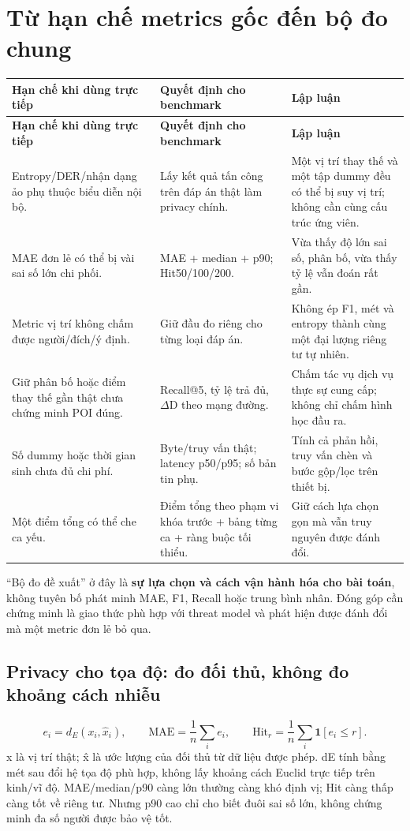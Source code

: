 \documentclass[10pt,a4paper]{article}
\begin{document}
\clearpage
\section{Từ hạn chế metrics gốc đến bộ đo chung}
\begingroup\small
\begin{longtable}{@{}P{5.218cm}P{5.021cm}P{6.399cm}@{}}
\toprule
\textbf{Hạn chế khi dùng trực tiếp} & \textbf{Quyết định cho benchmark} & \textbf{Lập luận}\\\midrule
\endfirsthead
\toprule
\textbf{Hạn chế khi dùng trực tiếp} & \textbf{Quyết định cho benchmark} & \textbf{Lập luận}\\\midrule
\endhead
\bottomrule\endfoot
Entropy/DER/nhận dạng ảo phụ thuộc biểu diễn nội bộ. & Lấy kết quả tấn công trên đáp án thật làm privacy chính. & Một vị trí thay thế và một tập dummy đều có thể bị suy vị trí; không cần cùng cấu trúc ứng viên.\\
\addlinespace[3pt]
MAE đơn lẻ có thể bị vài sai số lớn chi phối. & MAE + median + p90; Hit50/100/200. & Vừa thấy độ lớn sai số, phân bố, vừa thấy tỷ lệ vẫn đoán rất gần.\\
\addlinespace[3pt]
Metric vị trí không chấm được người/đích/ý định. & Giữ đầu đo riêng cho từng loại đáp án. & Không ép F1, mét và entropy thành cùng một đại lượng riêng tư tự nhiên.\\
\addlinespace[3pt]
Giữ phân bố hoặc điểm thay thế gần thật chưa chứng minh POI đúng. & Recall@5, tỷ lệ trả đủ, $\Delta$D theo mạng đường. & Chấm tác vụ dịch vụ thực sự cung cấp; không chỉ chấm hình học đầu ra.\\
\addlinespace[3pt]
Số dummy hoặc thời gian sinh chưa đủ chi phí. & Byte/truy vấn thật; latency p50/p95; số bản tin phụ. & Tính cả phản hồi, truy vấn chèn và bước gộp/lọc trên thiết bị.\\
\addlinespace[3pt]
Một điểm tổng có thể che ca yếu. & Điểm tổng theo phạm vi khóa trước + bảng từng ca + ràng buộc tối thiểu. & Giữ cách lựa chọn gọn mà vẫn truy nguyên được đánh đổi.\\
\end{longtable}
\endgroup
“Bộ đo đề xuất” ở đây là \textbf{sự lựa chọn và cách vận hành hóa cho bài toán}, không tuyên bố phát minh MAE, F1, Recall hoặc trung bình nhân. Đóng góp cần chứng minh là giao thức phù hợp với threat model và phát hiện được đánh đổi mà một metric đơn lẻ bỏ qua.

\subsection{Privacy cho tọa độ: đo đối thủ, không đo khoảng cách nhiễu}
\[
e_i=d_E(x_i,\widehat x_i),\qquad \mathrm{MAE}=\frac1n\sum_i e_i,\qquad \mathrm{Hit}_r=\frac1n\sum_i\mathbf1[e_i\le r].
\]
x là vị trí thật; x̂ là ước lượng của đối thủ từ dữ liệu được phép. dE tính bằng mét sau đổi hệ tọa độ phù hợp, không lấy khoảng cách Euclid trực tiếp trên kinh/vĩ độ. MAE/median/p90 càng lớn thường càng khó định vị; Hit càng thấp càng tốt về riêng tư. Nhưng p90 cao chỉ cho biết đuôi sai số lớn, không chứng minh đa số người được bảo vệ tốt.
\end{document}
